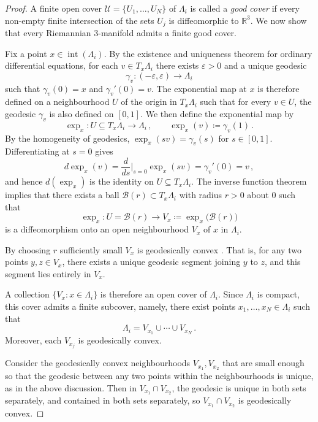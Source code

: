 \documentclass[11pt]{article}
\theoremstyle{plain}
\theoremstyle{definition}
\theoremstyle{remark}
\newcommand{\B}{\mathcal{B}}
\newcommand{\ST}{\Lambda}
\begin{document}
\begin{proof}
   


A finite open cover \(\mathcal{U}=\{U_1,\dots,U_N\}\) of \(\ST_i\) is called a \emph{good cover} if every non-empty finite intersection of the sets \(U_j\) is diffeomorphic to \(\mathbb{R}^3\). We now show that every Riemannian \(3\)-manifold admits a finite good cover.

Fix a point \(x\in \operatorname{int}(\ST_i)\). By the existence and uniqueness theorem for ordinary differential equations, for each \(v\in T_x\ST_i\) there exists \(\varepsilon>0\) and a unique geodesic
\[
    \gamma_v:(-\varepsilon,\varepsilon)\to \ST_i
\]
such that \(\gamma_v(0)=x\) and \(\gamma_v'(0)=v\). The exponential map at \(x\) is therefore defined on a neighbourhood \(U\) of the origin in \(T_x\ST_i\) such that for every \(v \in U\), the geodesic \(\gamma_v\) is also defined on \([0,1]\). We then define the exponential map by
\[
    \exp_x : U \subseteq  T_x\ST_i \longrightarrow \ST_i \, , 
    \qquad 
    \exp_x(v)\coloneqq \gamma_v(1) \, .
\]
By the homogeneity of geodesics, \(\exp_x(sv)=\gamma_v(s)\) for \(s \in [0,1]\). Differentiating at \(s=0\) gives
\[
    d\exp_x(v)
    =
    \frac{d}{ds}\Big|_{s=0}\exp_x(sv)
    =
    \gamma_v'(0)
    =
    v \, ,
\]
and hence \(d(\exp_x)\) is the identity on \(U \subseteq T_x \ST_i\). The inverse function theorem implies that there exists a ball \(\B(r) \subset  T_x\ST_i\) with radius \(r>0\) about \(0\) such that 
\[
    \exp_x : U = \B(r)\longrightarrow V_x\coloneqq \exp_x\bigl(\B(r)\bigr)
\]
is a diffeomorphism onto an open neighbourhood \(V_x\) of \(x\) in \(\ST_i\).

By choosing \(r\) sufficiently small \(V_x\) is geodesically convex \cite{lee}. That is, for any two points \(y,z\in V_x\), there exists a unique geodesic segment joining \(y\) to \(z\), and this segment lies entirely in \(V_x\).

A collection \(\{V_x : x\in \ST_i\}\) is therefore an open cover of \(\ST_i\). Since \(\ST_i\) is compact, this cover admits a finite subcover, namely, there exist points \(x_1,\dots,x_N\in \ST_i\) such that
\[
    \ST_i = V_{x_1}\cup\cdots\cup V_{x_N} \, .
\]
Moreover, each \(V_{x_j}\) is geodesically convex.








Consider the geodesically convex neighbourhoods \(V_{x_1},V_{x_2}\) that are small enough so that the geodesic between any two points within the neighbourhoods is unique, as in the above discussion. Then in \(V_{x_1} \cap V_{x_2}\), the geodesic is unique in both sets separately, and contained in both sets separately, so \(V_{x_1} \cap V_{x_2}\) is geodesically convex. 


\end{proof}
\end{document}
